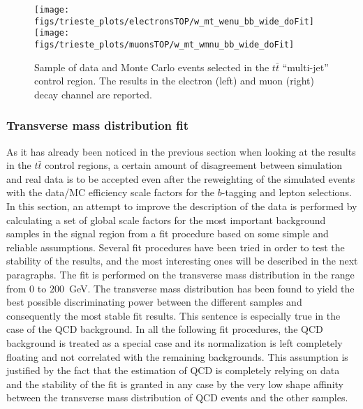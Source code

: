 \begin{figure}[htb]
	\begin{center}
		\leavevmode
		\texttt{[image: figs/trieste\_plots/electronsTOP/w\_mt\_wenu\_bb\_wide\_doFit]}
		\texttt{[image: figs/trieste\_plots/muonsTOP/w\_mt\_wmnu\_bb\_wide\_doFit]}
	\end{center}
	\caption{Sample of data and Monte Carlo events selected in the $t\bar{t}$ ``multi-jet'' control region. 
          The results in the electron (left) and muon (right) decay channel are reported.}
	\label{fig:ttbarFitmultijet}
\end{figure}

\subsubsection{Transverse mass distribution fit}
\label{sec:transversemassfit}

As it has already been noticed in the previous section when 
looking at the results in the $t\bar{t}$ control regions,
a certain amount of disagreement between simulation and 
real data is to be accepted even after the reweighting 
of the simulated events with the data/MC efficiency scale factors
for the $b$-tagging and lepton selections.
In this section, an attempt to improve the description of the data 
is performed by calculating a set of global scale factors for the 
most important background samples in the signal region 
from a fit procedure based on some
simple and reliable assumptions. 
Several fit procedures have been tried in order to test the stability 
of the results, and the most interesting ones will be described
in the next paragraphs.
The fit is performed on the transverse mass distribution in the range 
from $0$ to $200$~GeV. The transverse mass distribution has been found 
to yield the best possible discriminating power between the different 
samples and consequently the most stable fit results.
This sentence is especially true in the case of the QCD background.
In all the following fit procedures, the QCD background is treated as 
a special case and its normalization is left completely floating
and not correlated with the remaining backgrounds.
This assumption is justified by the fact that the estimation of QCD is 
completely relying on data and the stability of the fit is granted 
in any case by the very low shape affinity between the 
transverse mass distribution of QCD events and the other samples.

